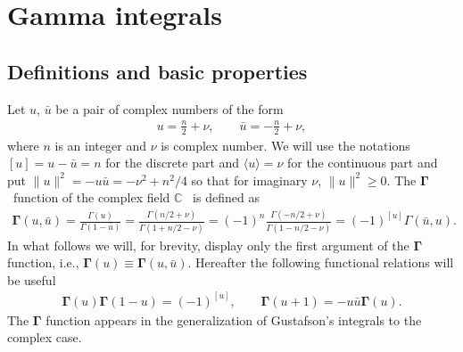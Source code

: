 \documentclass[pdftex]{sigma}
\numberwithin{equation}{section}
\begin{document}
\section{ Gamma integrals}\label{sect:two}

\subsection{Definitions and basic properties}\label{subsec:def}

Let $u$, $\bar u$ be a pair of complex numbers of the form
\begin{gather}\label{def:z}
u=\frac n2+\nu, \qquad \bar u=-\frac n2+\nu,
\end{gather}
where $n$ is an integer and $\nu$ is complex number. We will use the notations $[u] = u-\bar u=n$ for the discrete
part and $\langle u \rangle = \nu$ for the continuous part and put $\|u\|^2=-u\bar u= -\nu^2+n^2/4$ so that for
imaginary $\nu$, $\|u\|^2\geq 0$. The $\boldsymbol \Gamma$~function of the complex field $\mathbb C$~\cite{GelfandGraevRetakh04} is defined as
\begin{gather*}
{\boldsymbol{\Gamma}}(u,\bar u)=\frac{\Gamma(u)}{\Gamma(1-\bar u)}
=\frac{\Gamma(n/2+\nu)}{\Gamma(1+n/2-\nu)}=(-1)^n\frac{\Gamma(-n/2+\nu)}{\Gamma(1-n/2-\nu)} =(-1)^{[u]}\Gamma(\bar u, u).
\end{gather*}
In what follows we will, for brevity, display only the first argument of the $\boldsymbol \Gamma$ function, i.e.,
$\boldsymbol \Gamma(u)\equiv \boldsymbol \Gamma(u,\bar u)$. Hereafter the following functional relations will be useful
\begin{gather}\label{func:gamma}
\boldsymbol \Gamma(u)\boldsymbol \Gamma(1-u)=(-1)^{[u]}, \qquad
\boldsymbol \Gamma(u+1)=-u\bar u \boldsymbol \Gamma(u).
\end{gather}
The $\boldsymbol \Gamma$ function appears in the generalization of Gustafson's integrals to the complex case.
\end{document}
